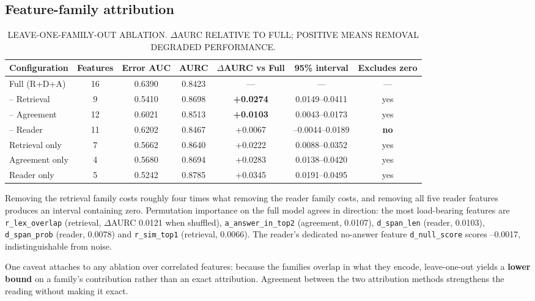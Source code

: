 \documentclass[conference]{IEEEtran}
\begin{document}
\subsection{Feature-family attribution}

\begin{table}[t]\centering\caption{LEAVE-ONE-FAMILY-OUT ABLATION. $\Delta$AURC RELATIVE TO FULL; POSITIVE MEANS REMOVAL DEGRADED PERFORMANCE.}\label{tab:6}\footnotesize
\begin{tabular}{lcccccc}\hline
\textbf{Configuration} & \textbf{Features} & \textbf{Error AUC} & \textbf{AURC} & \textbf{$\Delta$AURC vs Full} & \textbf{95\% interval} & \textbf{Excludes zero} \\ \hline
Full (R+D+A) & 16 & 0.6390 & 0.8423 & --- & --- & --- \\
-- Retrieval & 9 & 0.5410 & 0.8698 & \textbf{+0.0274} & 0.0149--0.0411 & yes \\
-- Agreement & 12 & 0.6021 & 0.8513 & \textbf{+0.0103} & 0.0043--0.0173 & yes \\
-- Reader & 11 & 0.6202 & 0.8467 & +0.0067 & --0.0044--0.0189 & \textbf{no} \\
Retrieval only & 7 & 0.5662 & 0.8640 & +0.0222 & 0.0088--0.0352 & yes \\
Agreement only & 4 & 0.5680 & 0.8694 & +0.0283 & 0.0138--0.0420 & yes \\
Reader only & 5 & 0.5242 & 0.8785 & +0.0345 & 0.0191--0.0495 & yes \\
\hline\end{tabular}\end{table}

Removing the retrieval family costs roughly four times what removing the reader family costs, and removing all five reader features produces an interval containing zero. Permutation importance on the full model agrees in direction: the most load-bearing features are \texttt{r\_lex\_overlap} (retrieval, $\Delta$AURC 0.0121 when shuffled), \texttt{a\_answer\_in\_top2} (agreement, 0.0107), \texttt{d\_span\_len} (reader, 0.0103), \texttt{d\_span\_prob} (reader, 0.0078) and \texttt{r\_sim\_top1} (retrieval, 0.0066). The reader's dedicated no-answer feature \texttt{d\_null\_score} scores --0.0017, indistinguishable from noise.

One caveat attaches to any ablation over correlated features: because the families overlap in what they encode, leave-one-out yields a \textbf{lower bound} on a family's contribution rather than an exact attribution. Agreement between the two attribution methods strengthens the reading without making it exact.
\end{document}
